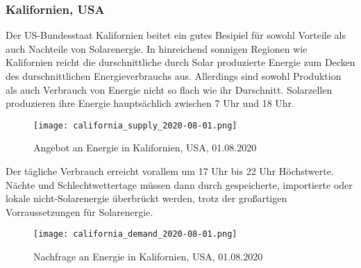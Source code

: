     \subsubsection{Kalifornien, USA}
        Der US-Bundesstaat Kalifornien beitet ein gutes Besipiel für sowohl
        Vorteile als auch Nachteile von Solarenergie. In hinreichend sonnigen
        Regionen wie Kalifornien reicht die durschnittliche durch Solar
        produzierte Energie zum Decken des durschnittlichen Energieverbrauchs
        aus. Allerdings sind sowohl Produktion als auch Verbrauch von
        Energie nicht so flach wie ihr Durschnitt. Solarzellen produzieren
        ihre Energie hauptsächlich zwischen 7 Uhr und 18 Uhr.
        \begin{figure}[H]
            \centering
            \texttt{[image: california\_supply\_2020-08-01.png]}
            \caption{Angebot an Energie in Kalifornien, USA, 01.08.2020
                \cite{Img_CaliforniaSupply}
            }
        \end{figure}
        \noindent
        Der tägliche Verbrauch erreicht vorallem um 17 Uhr bis 22 Uhr Höchstwerte.
        Nächte und Schlechtwettertage müssen dann durch gespeicherte, importierte
        oder lokale nicht-Solarenergie überbrückt werden, trotz der großartigen
        Vorraussetzungen für Solarenergie.
        \cite{SolarCalifornia, YouTube_RE-California}
        \begin{figure}[H]
            \centering
            \texttt{[image: california\_demand\_2020-08-01.png]}
            \caption{Nachfrage an Energie in Kalifornien, USA, 01.08.2020
                \cite{Img_CaliforniaDemand}
            }
        \end{figure}